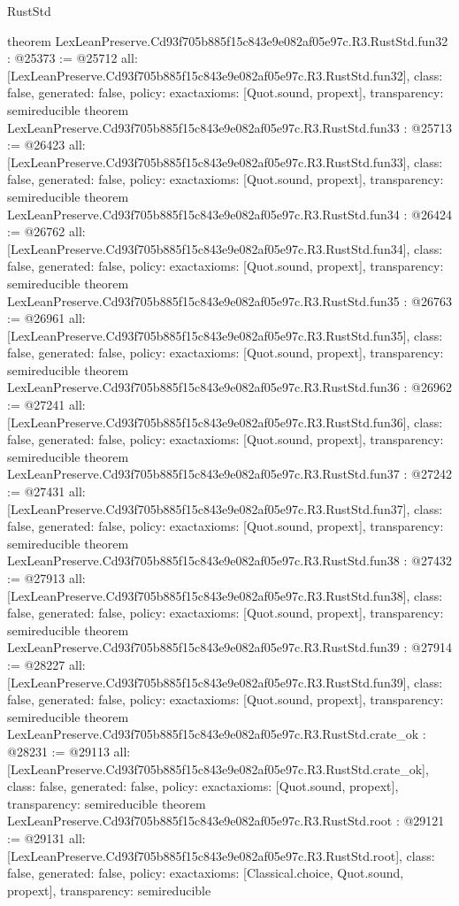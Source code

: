 \begin{lexlean}{RustStd}
\begin{coremodule}
{}
theorem LexLeanPreserve.Cd93f705b885f15c843e9e082af05e97c.R3.RustStd.fun32 : @25373 := @25712 {
  all: [LexLeanPreserve.Cd93f705b885f15c843e9e082af05e97c.R3.RustStd.fun32],
  class: false,
  generated: false,
  policy: exact{axioms: [Quot.sound, propext]},
  transparency: semireducible
}
theorem LexLeanPreserve.Cd93f705b885f15c843e9e082af05e97c.R3.RustStd.fun33 : @25713 := @26423 {
  all: [LexLeanPreserve.Cd93f705b885f15c843e9e082af05e97c.R3.RustStd.fun33],
  class: false,
  generated: false,
  policy: exact{axioms: [Quot.sound, propext]},
  transparency: semireducible
}
theorem LexLeanPreserve.Cd93f705b885f15c843e9e082af05e97c.R3.RustStd.fun34 : @26424 := @26762 {
  all: [LexLeanPreserve.Cd93f705b885f15c843e9e082af05e97c.R3.RustStd.fun34],
  class: false,
  generated: false,
  policy: exact{axioms: [Quot.sound, propext]},
  transparency: semireducible
}
theorem LexLeanPreserve.Cd93f705b885f15c843e9e082af05e97c.R3.RustStd.fun35 : @26763 := @26961 {
  all: [LexLeanPreserve.Cd93f705b885f15c843e9e082af05e97c.R3.RustStd.fun35],
  class: false,
  generated: false,
  policy: exact{axioms: [Quot.sound, propext]},
  transparency: semireducible
}
theorem LexLeanPreserve.Cd93f705b885f15c843e9e082af05e97c.R3.RustStd.fun36 : @26962 := @27241 {
  all: [LexLeanPreserve.Cd93f705b885f15c843e9e082af05e97c.R3.RustStd.fun36],
  class: false,
  generated: false,
  policy: exact{axioms: [Quot.sound, propext]},
  transparency: semireducible
}
theorem LexLeanPreserve.Cd93f705b885f15c843e9e082af05e97c.R3.RustStd.fun37 : @27242 := @27431 {
  all: [LexLeanPreserve.Cd93f705b885f15c843e9e082af05e97c.R3.RustStd.fun37],
  class: false,
  generated: false,
  policy: exact{axioms: [Quot.sound, propext]},
  transparency: semireducible
}
theorem LexLeanPreserve.Cd93f705b885f15c843e9e082af05e97c.R3.RustStd.fun38 : @27432 := @27913 {
  all: [LexLeanPreserve.Cd93f705b885f15c843e9e082af05e97c.R3.RustStd.fun38],
  class: false,
  generated: false,
  policy: exact{axioms: [Quot.sound, propext]},
  transparency: semireducible
}
theorem LexLeanPreserve.Cd93f705b885f15c843e9e082af05e97c.R3.RustStd.fun39 : @27914 := @28227 {
  all: [LexLeanPreserve.Cd93f705b885f15c843e9e082af05e97c.R3.RustStd.fun39],
  class: false,
  generated: false,
  policy: exact{axioms: [Quot.sound, propext]},
  transparency: semireducible
}
theorem LexLeanPreserve.Cd93f705b885f15c843e9e082af05e97c.R3.RustStd.crate_ok : @28231 := @29113 {
  all: [LexLeanPreserve.Cd93f705b885f15c843e9e082af05e97c.R3.RustStd.crate_ok],
  class: false,
  generated: false,
  policy: exact{axioms: [Quot.sound, propext]},
  transparency: semireducible
}
theorem LexLeanPreserve.Cd93f705b885f15c843e9e082af05e97c.R3.RustStd.root : @29121 := @29131 {
  all: [LexLeanPreserve.Cd93f705b885f15c843e9e082af05e97c.R3.RustStd.root],
  class: false,
  generated: false,
  policy: exact{axioms: [Classical.choice, Quot.sound, propext]},
  transparency: semireducible
}


\end{coremodule}
\end{lexlean}
